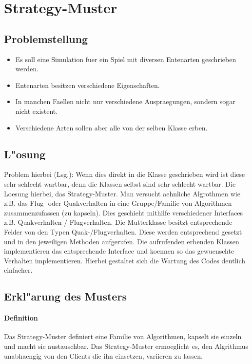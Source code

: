\section{Strategy-Muster}

\subsection{Problemstellung}
\begin{itemize}
\item Es soll eine Simulation fuer ein Spiel mit diversen Entenarten geschrieben werden.
\item Entenarten besitzen verschiedene Eigenschaften.
\item In manchen Faellen nicht nur verschiedene Auspraegungen, sondern sogar nicht existent. 
\item Verschiedene Arten sollen aber alle von der selben Klasse erben. 
\end{itemize}

\subsection{L"osung}
Problem hierbei (Lsg.): 
Wenn  dies direkt in die Klasse geschrieben  wird ist diese sehr schlecht wartbar,  denn die Klassen selbst 
sind  sehr  schlecht wartbar. Die  Loesung  hierbei,  das  Strategy-Muster.  Man versucht  aehnliche
Algrothmen wie z.B. das Flug- oder Quakverhalten in eine Gruppe/Familie von Algorithmen 
zusammenzufassen (zu kapseln). Dies geschieht mithilfe verschiedener Interfaces z.B. 
Quakverhalten  /  Flugverhalten.  Die  Mutterklasse  besitzt  entsprechende  Felder  von  den  Typen
Quak-/Flugverhalten.  Diese werden entsprechend gesetzt  und in  den jeweiligen Methoden aufgerufen.
Die  aufrufenden erbenden  Klassen implementieren  das  entsprechende  Interface und  koennen so das
gewuenschte Verhalten  implementieren.  Hierbei  gestaltet  sich  die  Wartung  des  Codes  deutlich
einfacher.

\subsection{Erkl"arung des Musters}
\paragraph{Definition}
Das  Strategy-Muster definiert  eine  Familie von Algorithmen,  kapselt  sie  einzeln  und macht sie
austauschbar. Das Strategy-Muster  ermoeglicht  es, den  Algrithmus unabhaengig  von den Clients die
ihn einsetzen, variieren zu lassen.

